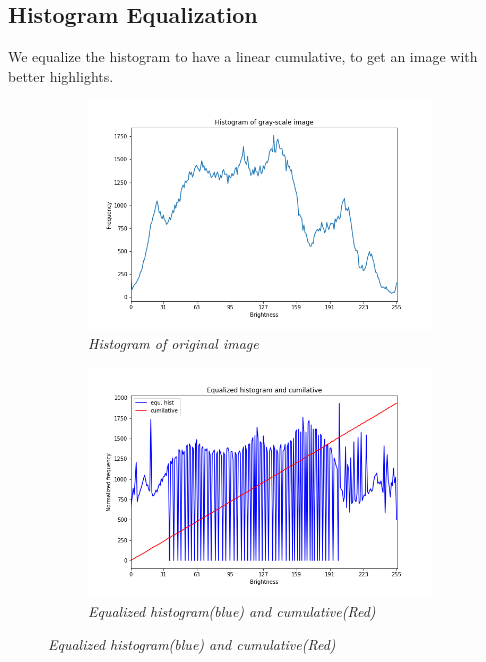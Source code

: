 \documentclass[11pt, a4paper]{article}
\begin{document}
\subsection{Histogram Equalization}
We equalize the histogram to have a linear cumulative, to get an image with better highlights.
\begin{figure}[H]
	\centering
	\begin{subfigure}[b]{0.32\textwidth}
		\centering
		\includegraphics[width=\textwidth]{./Outputs/Histogram.png}
		\caption{{\small \textit{Histogram of original image}}}
		\label{fig:Original Histogram}
	\end{subfigure}
	\hfill
	\begin{subfigure}[b]{0.32\textwidth}
		\centering
		\includegraphics[width=\textwidth]{./Outputs/Equalized_Histogram.png}
		\caption{{\small \textit{Equalized histogram(blue) and cumulative(Red)}}}
		\label{fig:Equalized Histogram}

\end{subfigure}
\end{figure}
\end{document}

